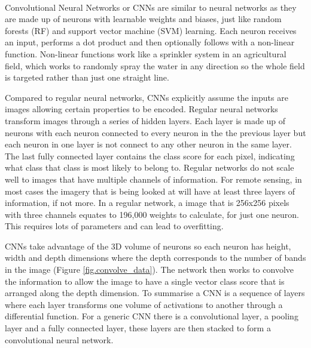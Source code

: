 \paragraph{}
Convolutional Neural Networks or CNNs are similar to neural networks as they are made up of neurons with learnable weights and biases, just like random forests (RF) and support vector machine (SVM) learning. Each neuron receives an input, performs a dot product and then optionally follows with a non-linear function. Non-linear functions work like a sprinkler system in an agricultural field, which works to randomly spray the water in any direction so the whole field is targeted rather than just one straight line. 
\par Compared to regular neural networks, CNNs explicitly assume the inputs are images allowing certain properties to be encoded. Regular neural networks transform images through a series of hidden layers. Each layer is made up of neurons with each neuron connected to every neuron in the the previous layer but each neuron in one layer is not connect to any other neuron in the same layer. The last fully connected layer contains the class score for each pixel, indicating what class that class is most likely to belong to. Regular networks do not scale well to images that have multiple channels of information. For remote sensing, in most cases the imagery that is being looked at will have at least three layers of information, if not more. In a regular network, a image that is 256x256 pixels with three channels equates to 196,000 weights to calculate, for just one neuron. This requires lots of parameters and can lead to overfitting. \par
CNNs take advantage of the 3D volume of neurons so each neuron has height, width and depth dimensions where the depth corresponds to the number of bands in the image (Figure \ref{fig.convolve_data}). The network then works to convolve the information to allow the image to have a single vector class score that is arranged along the depth dimension. To summarise a CNN is a sequence of layers where each layer transforms one volume of activations to another through a differential function. For a generic CNN there is a convolutional layer, a pooling layer and a fully connected layer, these layers are then stacked to form a convolutional neural network.
